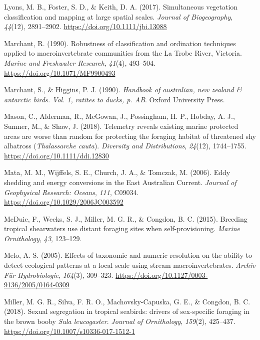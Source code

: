 \documentclass{article}
\newlength{\cslhangindent}
\newlength{\cslentryspacingunit} %
\newenvironment{CSLReferences}[2] %
 {%
  \setlength{\parindent}{0pt}
  \ifodd #1
  \let\oldpar\par
  \def\par{\hangindent=\cslhangindent\oldpar}
  \fi
  \setlength{\parskip}{#2\cslentryspacingunit}
 }%
 {}
\begin{document}
\begin{linenumbers}
\begin{CSLReferences}{1}{0}
\leavevmode{}%
Lyons, M. B., Foster, S. D., \& Keith, D. A. (2017). Simultaneous vegetation classification and mapping at large spatial scales. \emph{Journal of Biogeography}, \emph{44}(12), 2891--2902. \url{https://doi.org/10.1111/jbi.13088}

\leavevmode{}%
Marchant, R. (1990). Robustness of classification and ordination techniques applied to macroinvertebrate communities from the La Trobe River, Victoria. \emph{Marine and Freshwater Research}, \emph{41}(4), 493--504. \url{https://doi.org/10.1071/MF9900493}

\leavevmode{}%
Marchant, S., \& Higgins, P. J. (1990). \emph{Handbook of australian, new zealand \& antarctic birds. Vol. 1, ratites to ducks, p. AB}. Oxford University Press.

\leavevmode{}%
Mason, C., Alderman, R., McGowan, J., Possingham, H. P., Hobday, A. J., Sumner, M., \& Shaw, J. (2018). Telemetry reveals existing marine protected areas are worse than random for protecting the foraging habitat of threatened shy albatross ({\emph{Thalassarche cauta}}). \emph{Diversity and Distributions}, \emph{24}(12), 1744--1755. \url{https://doi.org/10.1111/ddi.12830}

\leavevmode{}%
Mata, M. M., Wijffels, S. E., Church, J. A., \& Tomczak, M. (2006). Eddy shedding and energy conversions in the East Australian Current. \emph{Journal of Geophysical Research: Oceans}, \emph{111}, C09034. \url{https://doi.org/10.1029/2006JC003592}

\leavevmode{}%
McDuie, F., Weeks, S. J., Miller, M. G. R., \& Congdon, B. C. (2015). Breeding tropical shearwaters use distant foraging sites when self-provisioning. \emph{Marine Ornithology}, \emph{43}, 123--129.

\leavevmode{}%
Melo, A. S. (2005). Effects of taxonomic and numeric resolution on the ability to detect ecological patterns at a local scale using stream macroinvertebrates. \emph{Archiv Für Hydrobiologie}, \emph{164}(3), 309--323. \url{https://doi.org/10.1127/0003-9136/2005/0164-0309}

\leavevmode{}%
Miller, M. G. R., Silva, F. R. O., Machovsky-Capuska, G. E., \& Congdon, B. C. (2018). Sexual segregation in tropical seabirds: drivers of sex-specific foraging in the brown booby {\emph{Sula leucogaster}}. \emph{Journal of Ornithology}, \emph{159}(2), 425--437. \url{https://doi.org/10.1007/s10336-017-1512-1}


\end{CSLReferences}
\end{linenumbers}
\end{document}

